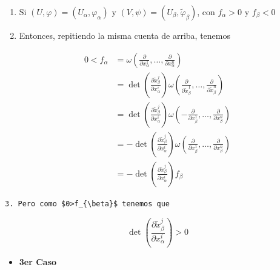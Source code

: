 \begin{bookproof}{}
\begin{itemize}
\begin{enumerate}
\item Si $(U,\varphi)=(U_\alpha,\varphi_\alpha)$ y $(V,\psi)=(U_\beta,\widetilde\varphi_\beta)$, con $f_\alpha>0$ y $f_\beta<0$
\item Entonces, repitiendo la misma cuenta de arriba, tenemos
\end{enumerate}
\end{itemize}
\[
\begin{aligned} 0<f_\alpha & =\omega\!\left(\frac{\partial}{\partial x_\alpha^1},\ldots,\frac{\partial}{\partial x_\alpha^n}\right)\\ &=\det\!\left(\frac{\partial \widetilde x_\beta^j}{\partial x_\alpha^i}\right)\omega\!\left(\frac{\partial}{\partial \widetilde x_\beta^1},\ldots,\frac{\partial}{\partial \widetilde x_\beta^n}\right)\\&=\det\!\left(\frac{\partial \widetilde x_\beta^j}{\partial x_\alpha^i}\right)\omega\!\left(-\frac{\partial}{\partial x_\beta^1},\ldots,\frac{\partial}{\partial x_\beta^n}\right)\\&=-\det\!\left(\frac{\partial \widetilde x_\beta^j}{\partial x_\alpha^i}\right)\omega\!\left(\frac{\partial}{\partial x_\beta^1},\ldots,\frac{\partial}{\partial x_\beta^n}\right)\\&=-\det\!\left(\frac{\partial \widetilde x_\beta^j}{\partial x_\alpha^i}\right)f_{\beta }\end{aligned}
\]
\begin{Verbatim}[fontsize=\small]
 3. Pero como $0>f_{\beta}$ tenemos que 
\end{Verbatim}
\[
\det\!\left(\frac{\partial \widetilde x_\beta^j}{\partial x_\alpha^i}\right)>0
\]
\begin{itemize}
\item \textbf{3er Caso}


\end{itemize}
\end{bookproof}

